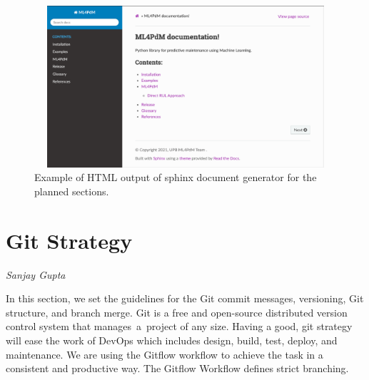 \begin{figure}[H]
	\centering
	\includegraphics[width=12cm,height=6cm]{gfx/html.png}
	\caption{Example of HTML output of sphinx document generator for the planned sections.}
	\label{fig:html_output}
\end{figure}

\section{Git Strategy}
\vspace*{-10mm}\hfill{\normalsize\emph{Sanjay Gupta}}
\label{sec:quality_assurance:git}

In this section, we set the guidelines for the Git commit messages, versioning, Git structure, and branch merge. Git is a free and open-source distributed version control system that manages a project of any size. Having a good, git strategy will ease the work of DevOps which includes design, build, test, deploy, and maintenance. We are using the Gitflow workflow to achieve the task in a consistent and productive way. The Gitflow Workflow defines strict branching.

